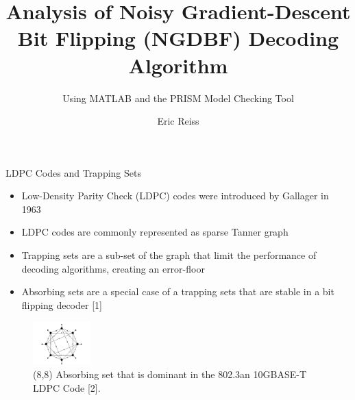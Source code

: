 \documentclass[10pt,ignorenonframetext,]{beamer}
\title{Analysis of Noisy Gradient-Descent Bit Flipping (NGDBF) Decoding
Algorithm}
\subtitle{Using MATLAB and the PRISM Model Checking Tool}
\author{Eric Reiss}
\date{}
\providecommand{\tightlist}{%
  \setlength{\itemsep}{0pt}\setlength{\parskip}{0pt}}
\begin{document}
\frame{\titlepage}

\begin{frame}{LDPC Codes and Trapping Sets}
\protect\hypertarget{ldpc-codes-and-trapping-sets}{}
\begin{itemize}[<+->]
\tightlist
\item
  Low-Density Parity Check (LDPC) codes were introduced by Gallager in
  1963
\item
  LDPC codes are commonly represented as sparse Tanner graph
\item
  Trapping sets are a sub-set of the graph that limit the performance of
  decoding algorithms, creating an error-floor
\item
  Absorbing sets are a special case of a trapping sets that are stable
  in a bit flipping decoder {[}1{]}
\end{itemize}

\begin{figure}
\centering
\includegraphics[width=0.2\textwidth,height=\textheight]{figures/8_8_absorbing.png}
\caption{(8,8) Absorbing set that is dominant in the 802.3an 10GBASE-T
LDPC Code {[}2{]}.}
\end{figure}
\end{frame}
\end{document}
